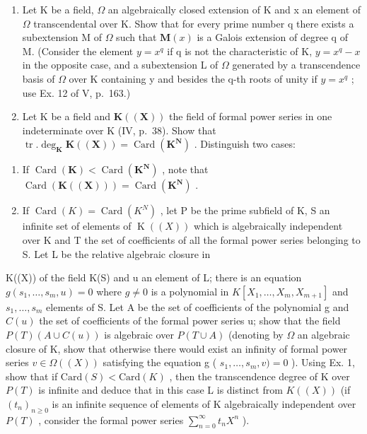 \begin{enumerate}
\def\labelenumi{\arabic{enumi})}
\setcounter{enumi}{16}
\item
  Let K be a field, \(\Omega\) an algebraically closed extension of K and x an element of \(\Omega\) transcendental over K. Show that for every prime number q there exists a subextension M of \(\Omega\) such that \(\mathbf{M}(x)\) is a Galois extension of degree q of M. (Consider the element \(y = x^{q}\) if q is not the characteristic of K, \(y = x^{q} - x\) in the opposite case, and a subextension L of \(\Omega\) generated by a transcendence basis of \(\Omega\) over K containing y and besides the q-th roots of unity if \(y = x^{q}\) ; use Ex. 12 of V, p.~163.)
\item
  Let K be a field and \(\mathbf{K}((\mathbf{X}))\) the field of formal power series in one indeterminate over K (IV, p.~38). Show that \(\operatorname{tr}.\deg_{\mathbf{K}}\mathbf{K}((\mathbf{X}))=\operatorname{Card}(\mathbf{K}^{\mathbf{N}})\) . Distinguish two cases:
\end{enumerate}

\begin{enumerate}
\def\labelenumi{\alph{enumi})}
\item
  If \(\operatorname{Card}(\mathbf{K}) < \operatorname{Card}(\mathbf{K}^{\mathbf{N}})\) , note that \(\operatorname{Card}(\mathbf{K}((\mathbf{X}))) = \operatorname{Card}(\mathbf{K}^{\mathbf{N}})\) .
\item
  If \(\operatorname{Card}(K) = \operatorname{Card}(K^{N})\) , let P be the prime subfield of K, S an infinite set of elements of \(\operatorname{K}((X))\) which is algebraically independent over K and T the set of coefficients of all the formal power series belonging to S. Let L be the relative algebraic closure in
\end{enumerate}

K((X)) of the field K(S) and u an element of L; there is an equation \(g(s_{1}, \ldots, s_{m}, u) = 0\) where \(g \neq 0\) is a polynomial in \(K[X_{1}, \ldots, X_{m}, X_{m+1}]\) and \(s_{1}, \ldots, s_{m}\) elements of S. Let A be the set of coefficients of the polynomial g and \(C(u)\) the set of coefficients of the formal power series u; show that the field \(P(T)(A \cup C(u))\) is algebraic over \(P(T \cup A)\) (denoting by \(\Omega\) an algebraic closure of K, show that otherwise there would exist an infinity of formal power series \(v \in \Omega((X))\) satisfying the equation g ( \(s_{1}, \ldots, s_{m}, v) = 0\) ). Using Ex. 1, show that if \(\text{Card}(S) < \text{Card}(K)\) , then the transcendence degree of K over \(P(T)\) is infinite and deduce that in this case L is distinct from \(K((X))\) (if \((t_{n})_{n \geqslant 0}\) is an infinite sequence of elements of K algebraically independent over \(P(T)\) , consider the formal power series \(\sum_{n=0}^{\infty} t_{n} X^{n}\) ).

